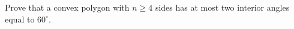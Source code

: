 Prove that a convex polygon with $n\ge4$ sides has at most two interior angles equal to $60^\circ$.
